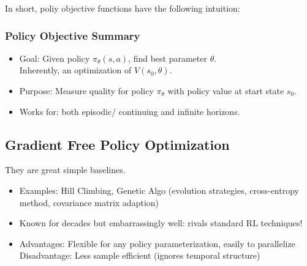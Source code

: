 \documentclass{article}
\begin{document}
In short, poliy objective functions have the following intuition:
\begin{defbox}
    \subsubsection*{Policy Objective Summary}
    \begin{itemize}
    \item Goal: Given policy $\pi_{\theta}(s, a)$, find best parameter $\theta$.
        \\Inherently, an optimization of $V(s_0, \theta)$.
    \item Purpose: Measure quality for policy $\pi_{\theta}$ with policy value at start state $s_0$.
    \item Works for: both episodic/ continuing and infinite horizons.
    \end{itemize}
\end{defbox}

\subsection{Gradient Free Policy Optimization}
They are great simple baselines.
\begin{itemize}
\item Examples: Hill Climbing, Genetic Algo (evolution strategies, cross-entropy method, covariance matrix adaption)
\item Known for decades but embarrassingly well: rivals standard RL techniques!
\item Advantages: Flexible for any policy parameterization, easily to parallelize
    \\Disadvantage: Less sample efficient (ignores temporal structure)
\end{itemize}
\end{document}
